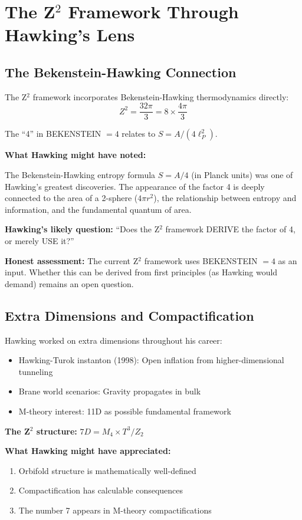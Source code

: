 \documentclass[12pt,a4paper]{article}
\begin{document}
\section{The Z$^2$ Framework Through Hawking's Lens}

\subsection{The Bekenstein-Hawking Connection}

The Z$^2$ framework incorporates Bekenstein-Hawking thermodynamics directly:
\begin{equation}
Z^2 = \frac{32\pi}{3} = 8 \times \frac{4\pi}{3}
\end{equation}

The ``4'' in BEKENSTEIN $= 4$ relates to $S = A/(4\ell_P^2)$.

\textbf{What Hawking might have noted:}

The Bekenstein-Hawking entropy formula $S = A/4$ (in Planck units) was one of Hawking's greatest discoveries. The appearance of the factor 4 is deeply connected to the area of a 2-sphere ($4\pi r^2$), the relationship between entropy and information, and the fundamental quantum of area.

\textbf{Hawking's likely question:} ``Does the Z$^2$ framework DERIVE the factor of 4, or merely USE it?''

\textbf{Honest assessment:} The current Z$^2$ framework uses BEKENSTEIN $= 4$ as an input. Whether this can be derived from first principles (as Hawking would demand) remains an open question.

\subsection{Extra Dimensions and Compactification}

Hawking worked on extra dimensions throughout his career:
\begin{itemize}
\item Hawking-Turok instanton (1998): Open inflation from higher-dimensional tunneling
\item Brane world scenarios: Gravity propagates in bulk
\item M-theory interest: 11D as possible fundamental framework
\end{itemize}

\textbf{The Z$^2$ structure:} $7D = M_4 \times T^3/Z_2$

\textbf{What Hawking might have appreciated:}
\begin{enumerate}
\item Orbifold structure is mathematically well-defined
\item Compactification has calculable consequences
\item The number 7 appears in M-theory compactifications
\end{enumerate}
\end{document}
